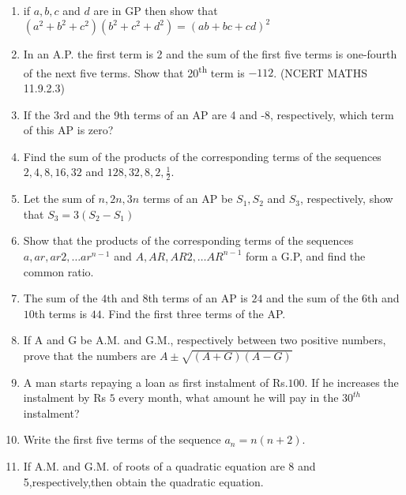 \begin{enumerate}[label=\thesection.\arabic*,ref=\thesection.\theenumi]
\item if $a,b,c$ and $d$ are in GP then show that $(a^{2}+b^{2}+c^{2})(b^{2}+c^{2}+d^{2})=(ab+bc+cd)^{2}$\\
\solution
\pagebreak

\item In an A.P. the first term is 2 and the sum of the first five terms is one-fourth of the next five terms. Show that 20\textsuperscript{th} term is $-112$. \hfill(NCERT MATHS 11.9.2.3)\\
\solution

\pagebreak
\item If the 3rd and the 9th terms of an AP are 4 and -8, respectively, which term of this AP is zero? \\
\solution
\pagebreak
\item Find the sum of the products of the corresponding terms of the sequences $2, 4, 8, 16, 32$ and $128, 32, 8, 2, \frac{1}{2}$.
\solution
\pagebreak

\item Let the sum of $n,2n,3n$ terms of an AP be $S_1,S_2$ and $S_3$, respectively, show that $S_3=3(S_2-S_1)$\\
\solution
\pagebreak

\item Show that the products of the corresponding terms of the sequences $a, ar, ar2, \ldots ar^{n-1}$ and $A, AR, AR2, \ldots AR^{n-1}$ form a G.P, and find the common ratio.
\solution
\pagebreak

\item
The sum of the $4$th and $8$th terms of an AP is $24$ and the sum of the $6$th and $10$th terms is $44$. Find the first three terms of the AP.\\
\solution\newpage

\item
If A and G be A.M. and G.M., respectively between two positive numbers, prove that the numbers are $A \pm \sqrt{(A+G)(A-G)}$\\
\solution
\newpage

 \item
A man starts repaying a loan as first instalment of Rs.$100$. If he increases the
instalment by Rs $5$ every month, what amount he will pay in the $30^{th}$ instalment? \\
\solution
\newpage

\item 
Write the first five terms of the sequence $a_n = n(n+2)$. \\
\solution
\newpage
\item If A.M. and G.M. of roots of a quadratic equation are 8 and 5,respectively,then obtain the quadratic equation.
\solution
\pagebreak


\end{enumerate}
